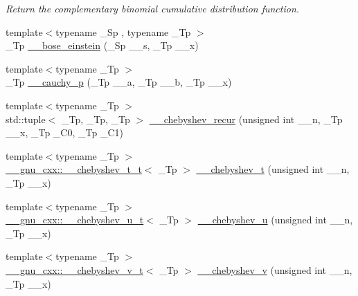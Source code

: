 \begin{DoxyCompactItemize}
\begin{DoxyCompactList}\small\item\em Return the complementary binomial cumulative distribution function. \end{DoxyCompactList}\item 
{\footnotesize template$<$typename \+\_\+\+Sp , typename \+\_\+\+Tp $>$ }\\\+\_\+\+Tp \hyperlink{namespacestd_1_1____detail_a75feb55399bc2c9c2ccff19877c8af2b}{\+\_\+\+\_\+bose\+\_\+einstein} (\+\_\+\+Sp \+\_\+\+\_\+s, \+\_\+\+Tp \+\_\+\+\_\+x)
\item 
{\footnotesize template$<$typename \+\_\+\+Tp $>$ }\\\+\_\+\+Tp \hyperlink{namespacestd_1_1____detail_ac92c91623b3e41c6384c977d5ec594e7}{\+\_\+\+\_\+cauchy\+\_\+p} (\+\_\+\+Tp \+\_\+\+\_\+a, \+\_\+\+Tp \+\_\+\+\_\+b, \+\_\+\+Tp \+\_\+\+\_\+x)
\item 
{\footnotesize template$<$typename \+\_\+\+Tp $>$ }\\std\+::tuple$<$ \+\_\+\+Tp, \+\_\+\+Tp, \+\_\+\+Tp $>$ \hyperlink{namespacestd_1_1____detail_a5fa9d67b4e0af4e0e018a06d198f0280}{\+\_\+\+\_\+chebyshev\+\_\+recur} (unsigned int \+\_\+\+\_\+n, \+\_\+\+Tp \+\_\+\+\_\+x, \+\_\+\+Tp \+\_\+\+C0, \+\_\+\+Tp \+\_\+\+C1)
\item 
{\footnotesize template$<$typename \+\_\+\+Tp $>$ }\\\hyperlink{struct____gnu__cxx_1_1____chebyshev__t__t}{\+\_\+\+\_\+gnu\+\_\+cxx\+::\+\_\+\+\_\+chebyshev\+\_\+t\+\_\+t}$<$ \+\_\+\+Tp $>$ \hyperlink{namespacestd_1_1____detail_ac23b4d357a95f4ba24503350999fd52d}{\+\_\+\+\_\+chebyshev\+\_\+t} (unsigned int \+\_\+\+\_\+n, \+\_\+\+Tp \+\_\+\+\_\+x)
\item 
{\footnotesize template$<$typename \+\_\+\+Tp $>$ }\\\hyperlink{struct____gnu__cxx_1_1____chebyshev__u__t}{\+\_\+\+\_\+gnu\+\_\+cxx\+::\+\_\+\+\_\+chebyshev\+\_\+u\+\_\+t}$<$ \+\_\+\+Tp $>$ \hyperlink{namespacestd_1_1____detail_a0ed32bbc4a1eaf32dc1dc5f423527008}{\+\_\+\+\_\+chebyshev\+\_\+u} (unsigned int \+\_\+\+\_\+n, \+\_\+\+Tp \+\_\+\+\_\+x)
\item 
{\footnotesize template$<$typename \+\_\+\+Tp $>$ }\\\hyperlink{struct____gnu__cxx_1_1____chebyshev__v__t}{\+\_\+\+\_\+gnu\+\_\+cxx\+::\+\_\+\+\_\+chebyshev\+\_\+v\+\_\+t}$<$ \+\_\+\+Tp $>$ \hyperlink{namespacestd_1_1____detail_a2ed217a1032c75d07ff34949de36d653}{\+\_\+\+\_\+chebyshev\+\_\+v} (unsigned int \+\_\+\+\_\+n, \+\_\+\+Tp \+\_\+\+\_\+x)

\end{DoxyCompactItemize}
